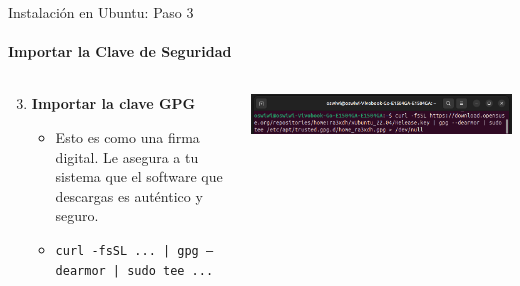 \documentclass{beamer}
\begin{document}
\begin{frame}[fragile]{Instalación en Ubuntu: Paso 3}
  \framesubtitle{Importar la Clave de Seguridad}

  \begin{columns}[T]
    \begin{column}{0.5\textwidth}
      \begin{enumerate}
        \setcounter{enumi}{2} %
        \item \textbf{Importar la clave GPG}
          \begin{itemize}
            \item Esto es como una firma digital. Le asegura a tu sistema que el software que descargas es auténtico y seguro.
            \item \small{\texttt{curl -fsSL ... | gpg --dearmor | sudo tee ...}}
          \end{itemize}
      \end{enumerate}
    \end{column}

    \begin{column}{0.5\textwidth}
      \includegraphics[width=\columnwidth]{Imagenes/InsP3.png}
    \end{column}
  \end{columns}
\end{frame}
\end{document}
